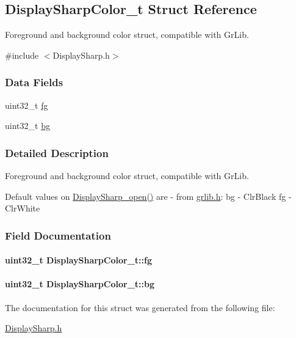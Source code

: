 \subsection{Display\+Sharp\+Color\+\_\+t Struct Reference}
\label{struct_display_sharp_color__t}


Foreground and background color struct, compatible with Gr\+Lib.  




{\ttfamily \#include $<$Display\+Sharp.\+h$>$}

\subsubsection*{Data Fields}
\begin{DoxyCompactItemize}
\item 
uint32\+\_\+t \hyperlink{struct_display_sharp_color__t_a98c48c9cef6f817b8bea0d1f7da88ffd}{fg}
\item 
uint32\+\_\+t \hyperlink{struct_display_sharp_color__t_a4a3d7b6e3b83826fabdfb2c2f75aa3c2}{bg}
\end{DoxyCompactItemize}


\subsubsection{Detailed Description}
Foreground and background color struct, compatible with Gr\+Lib. 

Default values on \hyperlink{_display_sharp_8h_a97a0ae6d2811237e4b0cddac24e04880}{Display\+Sharp\+\_\+open()} are -\/ from \hyperlink{grlib_8h}{grlib.\+h}\+: bg -\/ Clr\+Black fg -\/ Clr\+White 

\subsubsection{Field Documentation}
\paragraph[{fg}]{\setlength{\rightskip}{0pt plus 5cm}uint32\+\_\+t Display\+Sharp\+Color\+\_\+t\+::fg}\label{struct_display_sharp_color__t_a98c48c9cef6f817b8bea0d1f7da88ffd}
\paragraph[{bg}]{\setlength{\rightskip}{0pt plus 5cm}uint32\+\_\+t Display\+Sharp\+Color\+\_\+t\+::bg}\label{struct_display_sharp_color__t_a4a3d7b6e3b83826fabdfb2c2f75aa3c2}


The documentation for this struct was generated from the following file\+:\begin{DoxyCompactItemize}
\item 
\hyperlink{_display_sharp_8h}{Display\+Sharp.\+h}\end{DoxyCompactItemize}
